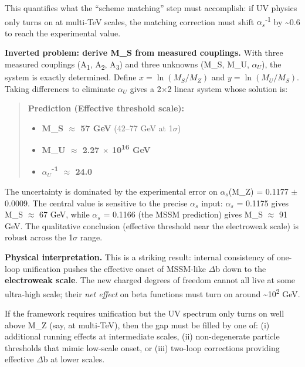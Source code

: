 \documentclass[11pt,a4paper]{article}
\theoremstyle{remark}
\providecommand{\tightlist}{%
  \setlength{\itemsep}{0pt}\setlength{\parskip}{0pt}}
\begin{document}
This quantifies what the ``scheme matching'' step must accomplish: if UV physics
only turns on at multi-TeV scales, the matching correction must shift
$\alpha_s$\textsuperscript{-1} by \textasciitilde0.6 to reach the experimental value.

\textbf{Inverted problem: derive M\_S from measured couplings.} With three measured
couplings (A\textsubscript{1}, A\textsubscript{2}, A\textsubscript{3}) and three unknowns (M\_S, M\_U, $\alpha_U$), the
system is exactly determined. Define \(x = \ln(M_S/M_Z)\) and
\(y = \ln(M_U/M_S)\). Taking differences to eliminate $\alpha_U$ gives a 2\ensuremath{\times}2
linear system whose solution is:

\begin{quote}
\textbf{Prediction (Effective threshold scale):}

\begin{itemize}
\tightlist
\item
  \textbf{M\_S \ensuremath{\approx} 57 GeV} (42--77 GeV at 1\ensuremath{\sigma})
\item
  \textbf{M\_U \ensuremath{\approx} 2.27 \ensuremath{\times} 10\textsuperscript{16} GeV}
\item
  \textbf{$\alpha_U$\textsuperscript{-1} \ensuremath{\approx} 24.0}
\end{itemize}
\end{quote}

The uncertainty is dominated by the experimental error on $\alpha_s$(M\_Z) = 0.1177 \ensuremath{\pm} 0.0009.
The central value is sensitive to the precise $\alpha_s$ input: $\alpha_s$ = 0.1175 gives
M\_S \ensuremath{\approx} 67 GeV, while $\alpha_s$ = 0.1166 (the MSSM prediction) gives M\_S \ensuremath{\approx} 91 GeV.
The qualitative conclusion (effective threshold near the electroweak scale)
is robust across the 1\ensuremath{\sigma} range.

\textbf{Physical interpretation.} This is a striking result: internal consistency of
one-loop unification pushes the effective onset of MSSM-like \ensuremath{\Delta}b down to the
\textbf{electroweak scale}. The new charged degrees of freedom cannot all live at
some ultra-high scale; their \emph{net effect} on beta functions must turn on around
\textasciitilde10\textsuperscript{2} GeV.

If the framework requires unification but the UV spectrum only turns on well
above M\_Z (say, at multi-TeV), then the gap must be filled by one of:
(i) additional running effects at intermediate scales,
(ii) non-degenerate particle thresholds that mimic low-scale onset, or
(iii) two-loop corrections providing effective \ensuremath{\Delta}b at lower scales.
\end{document}
